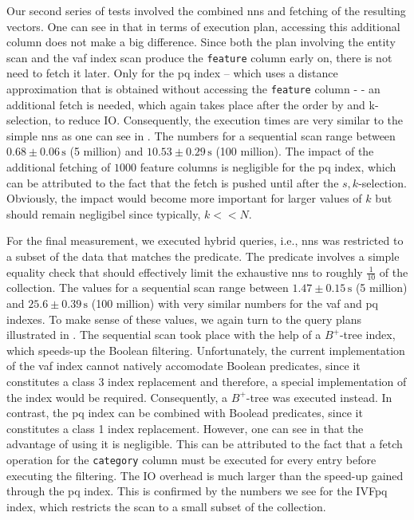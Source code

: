 Our second series of tests involved the combined \acrshort{nns} and fetching of the resulting vectors. One can see in  that in terms of execution plan, accessing this additional column does not make a big difference. Since both the plan involving the entity scan and the \acrshort{vaf} index scan produce the \texttt{feature} column early on, there is not need to fetch it later. Only for the \acrshort{pq} index -- which uses a distance approximation that is obtained without accessing the \texttt{feature} column - - an additional fetch is needed, which again takes place after the order by and k-selection, to reduce IO. Consequently, the execution times are very similar to the simple \acrshort{nns} as one can see in . The numbers for a sequential scan range between $0.68 \pm 0.06 \, \si{\second}$ (5 million) and $10.53 \pm 0.29 \, \si{\second}$ (100 million). The impact of the additional fetching of $1000$ feature columns is negligible for the \acrshort{pq} index, which can be attributed to the fact that the fetch is pushed until after the $s,k$-selection. Obviously, the impact would become more important for larger values of $k$ but should remain negligibel since typically, $k << N$.

For the final measurement, we executed hybrid queries, i.e., \acrshort{nns} was restricted to a subset of the data that matches the predicate. The predicate involves a simple equality check that should effectively limit the exhaustive \acrshort{nns} to roughly $\frac{1}{10}$ of the collection. The values for a sequential scan range between $1.47 \pm 0.15 \, \si{\second}$ (5 million) and $25.6 \pm 0.39 \, \si{\second}$ (100 million) with very similar numbers for the \acrshort{vaf} and \acrshort{pq} indexes. To make sense of these values, we again turn to the query plans illustrated in . The sequential scan took place with the help of a $B^{+}$-tree index, which speeds-up the Boolean filtering. Unfortunately, the current implementation of the \acrshort{vaf} index cannot natively accomodate Boolean predicates, since it constitutes a class 3 index replacement and therefore, a special implementation of the index would be required. Consequently, a $B^{+}$-tree was executed instead. In contrast, the \acrshort{pq} index can be combined with Boolead predicates, since it constitutes a class 1 index replacement. However, one can see in  that the advantage of using it is negligible.
This can be attributed to the fact that a fetch operation for the \texttt{category} column must be executed for every entry before executing the filtering. The IO overhead is much larger than the speed-up gained through the \acrshort{pq} index. This is confirmed by the numbers we see for the IVF\acrshort{pq} index, which restricts the scan to a small subset of the collection. 

